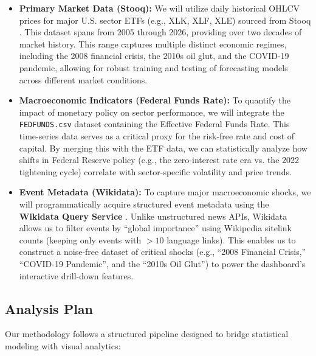 \documentclass{article}
\begin{document}
\begin{itemize}
    \item \textbf{Primary Market Data (Stooq):} We will utilize daily historical OHLCV prices for major U.S. sector ETFs (e.g., XLK, XLF, XLE) sourced from Stooq \cite{stooq}. This dataset spans from 2005 through 2026, providing over two decades of market history. This range captures multiple distinct economic regimes, including the 2008 financial crisis, the 2010s oil glut, and the COVID-19 pandemic, allowing for robust training and testing of forecasting models across different market conditions.
  
    \item \textbf{Macroeconomic Indicators (Federal Funds Rate):} To quantify the impact of monetary policy on sector performance, we will integrate the \texttt{FEDFUNDS.csv} dataset containing the Effective Federal Funds Rate. This time-series data serves as a critical proxy for the risk-free rate and cost of capital. By merging this with the ETF data, we can statistically analyze how shifts in Federal Reserve policy (e.g., the zero-interest rate era vs. the 2022 tightening cycle) correlate with sector-specific volatility and price trends.
    
    \item \textbf{Event Metadata (Wikidata):} To capture major macroeconomic shocks, we will programmatically acquire structured event metadata using the \textbf{Wikidata Query Service} \cite{wikidata}. Unlike unstructured news APIs, Wikidata allows us to filter events by ``global importance'' using Wikipedia sitelink counts (keeping only events with $>10$ language links). This enables us to construct a noise-free dataset of critical shocks (e.g., ``2008 Financial Crisis,'' ``COVID-19 Pandemic'', and the ``2010s Oil Glut'') to power the dashboard's interactive drill-down features.

\end{itemize}
\subsection{Analysis Plan}
Our methodology follows a structured pipeline designed to bridge statistical modeling with visual analytics:
\end{document}
